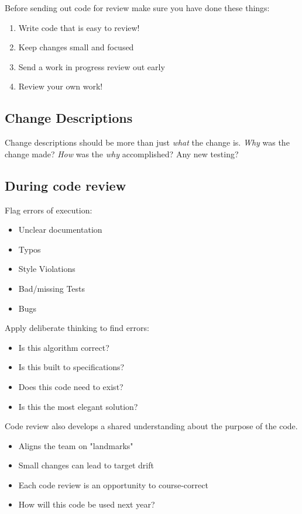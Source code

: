 \documentclass{article}
\begin{document}
\vspace*{1em}

Before sending out code for review make sure you have done these things:
\begin{enumerate}
    \item Write code that is easy to review!
    \item Keep changes small and focused
    \item Send a work in progress review out early
    \item Review your own work!
\end{enumerate}

\subsection{Change Descriptions}
Change descriptions should be more than just \textit{what} the change is. \textit{Why} was the change made? \textit{How} was the \textit{why} accomplished? Any new testing?

\vspace*{1em}

\subsection{During code review}

Flag errors of execution:
\begin{itemize}
    \item Unclear documentation
    \item Typos
    \item Style Violations
    \item Bad/missing Tests
    \item Bugs
\end{itemize}

Apply deliberate thinking to find errors:
\begin{itemize}
    \item Is this algorithm correct?
    \item Is this built to specifications?
    \item Does this code need to exist?
    \item Is this the most elegant solution?
\end{itemize}

\vspace*{1em}

Code review also develops a shared understanding about the purpose of the code. 
\begin{itemize}
    \item Aligns the team on "landmarks"
    \item Small changes can lead to target drift
    \item Each code review is an opportunity to course-correct
    \item How will this code be used next year?
\end{itemize}
\end{document}
